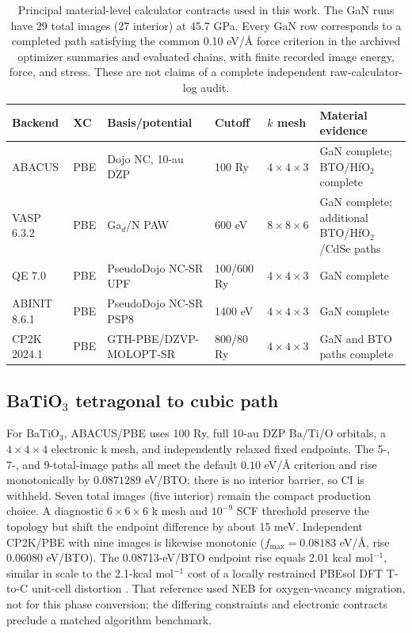 \documentclass[final,5p,times,twocolumn]{elsarticle}
\begin{document}
\begin{table}[t]
\centering
\caption{Principal material-level calculator contracts used in this work.
The GaN runs have 29 total images (27 interior) at 45.7 GPa. Every GaN row
corresponds to a completed path satisfying the common 0.10 eV/\AA{} force
criterion in the archived optimizer summaries and evaluated chains, with
finite recorded image energy, force, and stress. These are not claims of a
complete independent raw-calculator-log audit.}
\label{tab:calculators}
\begin{tabularx}{\textwidth}{l l l l l >{\raggedright\arraybackslash}X}
\toprule
Backend & XC & Basis/potential & Cutoff & $k$ mesh & Material evidence \\
\midrule
ABACUS & PBE & Dojo NC, 10-au DZP & 100 Ry & $4\times4\times3$ & GaN complete; BTO/HfO$_2$ complete \\
VASP 6.3.2 & PBE & Ga$_d$/N PAW & 600 eV & $8\times8\times6$ & GaN complete; additional BTO/HfO$_2$/CdSe paths \\
QE 7.0 & PBE & PseudoDojo NC-SR UPF & 100/600 Ry & $4\times4\times3$ & GaN complete \\
ABINIT 8.6.1 & PBE & PseudoDojo NC-SR PSP8 & 1400 eV & $4\times4\times3$ & GaN complete \\
CP2K 2024.1 & PBE & GTH-PBE/DZVP-MOLOPT-SR & 800/80 Ry & $4\times4\times3$ & GaN and BTO paths complete \\
\bottomrule
\end{tabularx}
\end{table}

\subsection{\texorpdfstring{BaTiO$_3$}{BaTiO3} tetragonal to cubic path}

For BaTiO$_3$, ABACUS/PBE uses 100 Ry, full 10-au DZP Ba/Ti/O orbitals,
a $4\times4\times4$ electronic k mesh, and independently relaxed fixed
endpoints. The 5-, 7-, and 9-total-image paths all meet the default
$0.10$ eV/\AA{} criterion and rise monotonically by $0.0871289$ eV/BTO;
there is no interior barrier, so CI is withheld. Seven total images (five
interior) remain the compact production choice. A diagnostic $6\times6\times6$
k mesh and $10^{-9}$ SCF threshold preserve the topology but shift the
endpoint difference by about 15 meV. Independent CP2K/PBE with nine images
is likewise monotonic ($f_{\max}=0.08183$ eV/\AA{}, rise 0.06080 eV/BTO).
The 0.08713-eV/BTO endpoint rise equals 2.01 kcal mol$^{-1}$, similar in
scale to the 2.1-kcal mol$^{-1}$ cost of a locally restrained PBEsol DFT
T-to-C unit-cell distortion \cite{BTOReaxFF2019}. That reference used NEB
for oxygen-vacancy migration, not for this phase conversion; the differing
constraints and electronic contracts preclude a matched algorithm benchmark.
\end{document}
